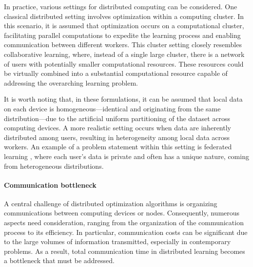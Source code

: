 \documentclass[sn-mathphys,Numbered]{sn-jnl}%
\renewcommand{\|}{\parallel}
\renewcommand {\*} {\ast}
\begin{document}
In practice, various settings for distributed computing can be considered. One classical distributed setting involves optimization within a computing cluster. In this scenario, it is assumed that optimization occurs on a computational cluster, facilitating parallel computations to expedite the learning process and enabling communication between different workers. This cluster setting closely resembles collaborative learning, where, instead of a single large cluster, there is a network of users with potentially smaller computational resources. These resources could be virtually combined into a substantial computational resource capable of addressing the overarching learning problem.

It is worth noting that, in these formulations, it can be assumed that local data on each device is homogeneous—identical and originating from the same distribution—due to the artificial uniform partitioning of the dataset across computing devices. A more realistic setting occurs when data are inherently distributed among users, resulting in heterogeneity among local data across workers. An example of a problem statement within this setting is federated learning \cite{konevcny2016federated,
kairouz2021advances,karimireddy2020scaffold}, where each user's data is private and often has a unique nature, coming from heterogeneous distributions.



\paragraph{Communication bottleneck} 

A central challenge of distributed optimization algorithms is organizing communications between computing devices or nodes. Consequently, numerous aspects need consideration, ranging from the organization of the communication process to its efficiency. In particular, communication costs can be significant due to the large volumes of information transmitted, especially in contemporary problems. As a result, total communication time in distributed learning becomes a bottleneck that must be addressed.

\end{document}
